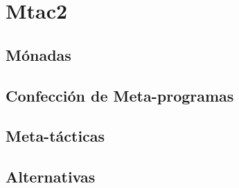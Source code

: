 \section{Mtac2}


\subsection{Mónadas}
\subsection{Confección de Meta-programas}
\subsection{Meta-tácticas}
\subsection{Alternativas}
